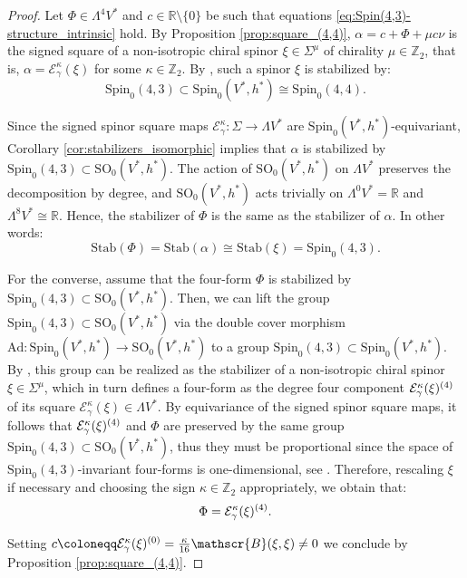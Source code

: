 \documentclass[10pt,reqno]{amsart}
\theoremstyle{definition}
\theoremstyle{remark}
\newcommand{\Z}{\mathbb{Z}}
\newcommand{\R}{\mathbb{R}}
\begin{document}
\begin{proof}
    Let $\Phi\in\Lambda^4V^*$ and $c\in\R\setminus\{0\}$ be such that equations \eqref{eq:Spin(4,3)-structure_intrinsic} hold. By Proposition \ref{prop:square_(4,4)}, $\alpha=c+\Phi+\mu c\nu$ is the signed square of a non-isotropic chiral spinor $\xi\in\Sigma^\mu$ of chirality $\mu\in\Z_2$, that is, $\alpha=\mathcal{E}^\kappa_\gamma(\xi)$ for some $\kappa\in\Z_2$. By \cite{Baum_Kath1999,Bhoja_Krasnov2022_II,Bryant2000}, such a spinor $\xi$ is stabilized by: $$\mathrm{Spin}_0(4,3)\subset\mathrm{Spin}_0(V^*,h^*)\cong\mathrm{Spin}_0(4,4).$$
    
    Since the signed spinor square maps $\mathcal{E}^\kappa_\gamma\colon\Sigma\to\Lambda V^*$ are $\mathrm{Spin}_0(V^*,h^*)$-equivariant, Corollary \ref{cor:stabilizers_isomorphic} implies that $\alpha$ is stabilized by $\mathrm{Spin}_0(4,3)\subset\mathrm{SO}_0(V^*,h^*)$. The action of $\mathrm{SO}_0(V^*,h^*)$ on $\Lambda V^*$ preserves the decomposition by degree, and $\mathrm{SO}_0(V^*,h^*)$ acts trivially on $\Lambda^0V^*=\R$ and $\Lambda^8V^*\cong\R$. Hence, the stabilizer of $\Phi$ is the same as the stabilizer of $\alpha$. In other words: $$\mathrm{Stab}(\Phi)=\mathrm{Stab}(\alpha)\cong\mathrm{Stab}(\xi)=\mathrm{Spin}_0(4,3).$$
    
    For the converse, assume that the four-form $\Phi$ is stabilized by $\mathrm{Spin}_0(4,3)\subset\mathrm{SO}_0(V^*,h^*)$. Then, we can lift the group $\mathrm{Spin}_0(4,3)\subset\mathrm{SO}_0(V^*,h^*)$ via the double cover morphism $\mathrm{Ad}\colon\mathrm{Spin}_0(V^*,h^*)\to\mathrm{SO}_0(V^*,h^*)$ to a group $\mathrm{Spin}_0(4,3)\subset\mathrm{Spin}_0(V^*,h^*)$. By \cite{Baum_Kath1999,Bhoja_Krasnov2022_II,Bryant2000}, this group can be realized as the stabilizer of a non-isotropic chiral spinor $\xi\in\Sigma^\mu$, which in turn defines a four-form as the degree four component $\mathcal{E}^\kappa_\gamma(\xi)^{\smash{(4)}}$ of its square $\mathcal{E}^\kappa_\gamma(\xi)\in\Lambda V^*$. By equivariance of the signed spinor square maps, it follows that $\mathcal{E}^\kappa_\gamma(\xi)^{\smash{(4)}}$ and $\Phi$ are preserved by the same group $\mathrm{Spin}_0(4,3)\subset\mathrm{SO}_0(V^*,h^*)$, thus they must be proportional since the space of $\mathrm{Spin}_0(4,3)$-invariant four-forms is one-dimensional, see \cite{Bryant1987}. Therefore, rescaling $\xi$ if necessary and choosing the sign $\kappa\in\Z_2$ appropriately, we obtain that: $$\Phi=\mathcal{E}^\kappa_\gamma(\xi)^{\smash{(4)}}.$$
    
    Setting $c\coloneqq\mathcal{E}^\kappa_\gamma(\xi)^{\smash{(0)}}=\frac{\kappa}{16}\mathscr{B}(\xi,\xi)\neq0$ we conclude by Proposition \ref{prop:square_(4,4)}.
\end{proof}
\end{document}
